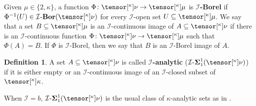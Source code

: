 \documentclass{amsart}
\numberwithin{equation}{section}
\newcommand{\I}{\mathcal{I}}
\newcommand{\pre}[2]{\tensor[^{#1}]{#2}{}}
\newcommand{\markdef}[1]{\textbf{#1}}
\newcommand{\1}{\mathbf{I}}
\newcommand{\2}{\mathbf{II}}
\newcommand{\Borid}{\I\text{-}\mathbf{Bor}}
\newcommand{\Siid}[2]{\I\text{-}\boldsymbol{\Sigma}^{ #1 }_{ #2}}
\renewcommand{\k}{\kappa}
\theoremstyle{definition}
\newtheorem{definition}[theorem]{Definition}
\theoremstyle{remark}
\begin{document}
Given \(\mu\in \{2,\k\}\), a function \(\Phi \colon \pre{\k}{\nu} \to \pre{\k}{\mu}\) 
is \markdef{\(\I\)-Borel} if \(\Phi^{-1}(U) \in \Borid(\pre{\k}{\nu})\) for every \(\I\)-open set \(U\subseteq \pre{\k}{\mu}\).
We say that a set $B \subseteq \pre{\k}{\mu}$ is an \(\I\)-continuous image of $A\subseteq \pre{\k}{\nu}$ if there is an \(\I\)-continuous function \(\Phi \colon \pre{\k}{\nu} \to \pre{\k}{\mu}\) such that $\Phi(A)=B$. If $\Phi$ is \(\I\)-Borel, then we say that $B$ is an \(\I\)-Borel image of $A$.


\begin{definition}\label{def:anal}
    A set \(A \subseteq \pre{\k}{\nu}\) is called \markdef{\(\I\)-analytic} (\(\Siid{1}{1}(\pre{\k}{\nu})\)) if it is either empty or an \(\I\)-continuous image of an \(\I\)-closed subset of \(\pre{\k}{\k}\).
\end{definition}

When \(\I=b\), \( \Siid{1}{1}(\pre{\k}{\nu} )\) is the usual class of \(\k\)-analytic sets as in \cite{FHK14, LS15, AMR}.
\end{document}

